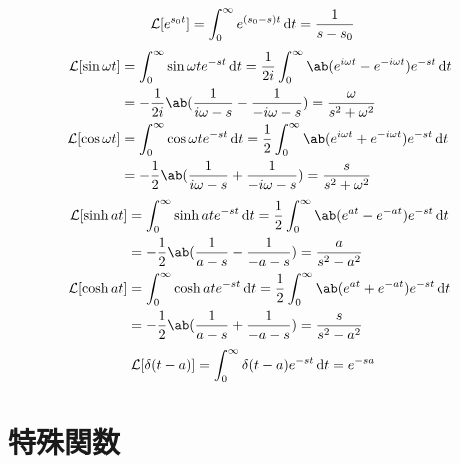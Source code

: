 \documentclass[uplatex,diffipdfmx,a4paper,11pt]{jlreq}
\newcommand{\LL}{\mathcal{L}}
\begin{document}
\begin{align}
  \LL[e^{s_0t}] & = \int_0^\infty e^{(s_0-s)t}\dl{t} = \frac{1}{s - s_0}
\end{align}
\begin{align}
  \LL[\sin\omega t] & = \int_0^\infty \sin\omega te^{-st}\dl{t} = \frac{1}{2i}\int_0^\infty \ab(e^{i\omega t} - e^{-i\omega t})e^{-st}\dl{t} \\
                    & = -\frac{1}{2i}\ab(\frac{1}{i\omega - s} - \frac{1}{-i\omega - s}) = \frac{\omega}{s^2 + \omega^2}                     \\
  \LL[\cos\omega t] & = \int_0^\infty \cos\omega te^{-st}\dl{t} = \frac{1}{2}\int_0^\infty \ab(e^{i\omega t} + e^{-i\omega t})e^{-st}\dl{t}  \\
                    & = -\frac{1}{2}\ab(\frac{1}{i\omega - s} + \frac{1}{-i\omega - s}) = \frac{s}{s^2 + \omega^2}
\end{align}
\begin{align}
  \LL[\sinh at] & = \int_0^\infty \sinh ate^{-st}\dl{t} = \frac{1}{2}\int_0^\infty \ab(e^{at} - e^{-at})e^{-st}\dl{t} \\
                & = -\frac{1}{2}\ab(\frac{1}{a - s} - \frac{1}{-a - s}) = \frac{a}{s^2 - a^2}                         \\
  \LL[\cosh at] & = \int_0^\infty \cosh ate^{-st}\dl{t} = \frac{1}{2}\int_0^\infty \ab(e^{at} + e^{-at})e^{-st}\dl{t} \\
                & = -\frac{1}{2}\ab(\frac{1}{a - s} + \frac{1}{-a - s}) = \frac{s}{s^2 - a^2}
\end{align}
\begin{align}
  \LL[\delta(t - a)] & = \int_0^\infty \delta(t - a)e^{-st}\dl{t} = e^{-sa}
\end{align}

\section{特殊関数}
\end{document}
